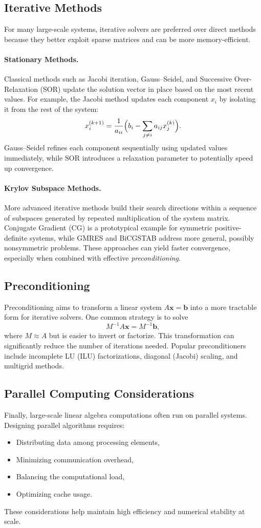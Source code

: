 \subsection{Iterative Methods}
For many large-scale systems, iterative solvers are preferred over direct methods because they better exploit sparse 
matrices and can be more memory-efficient.

\paragraph{Stationary Methods.}
Classical methods such as Jacobi iteration, Gauss--Seidel, and Successive Over-Relaxation (SOR) update the solution 
vector in place based on the most recent values. For example, the Jacobi method updates each component \(x_i\) by 
isolating it from the rest of the system:
\[
x_i^{(k+1)} 
= \frac{1}{a_{ii}} \Bigl(b_i - \sum_{j \neq i} a_{ij} x_j^{(k)}\Bigr).
\]
Gauss--Seidel refines each component sequentially using updated values immediately, while SOR introduces a 
relaxation parameter to potentially speed up convergence.

\paragraph{Krylov Subspace Methods.}
More advanced iterative methods build their search directions within a sequence of subspaces generated by repeated 
multiplication of the system matrix. Conjugate Gradient (CG) is a prototypical example for symmetric positive-definite 
systems, while GMRES and BiCGSTAB address more general, possibly nonsymmetric problems. These approaches can yield 
faster convergence, especially when combined with effective \emph{preconditioning}.

\subsection{Preconditioning}
Preconditioning aims to transform a linear system \(A \mathbf{x} = \mathbf{b}\) into a more tractable form for iterative 
solvers. One common strategy is to solve
\[
M^{-1} A \mathbf{x} = M^{-1} \mathbf{b},
\]
where \(M\approx A\) but is easier to invert or factorize. This transformation can significantly reduce the number of 
iterations needed. Popular preconditioners include incomplete LU (ILU) factorizations, diagonal (Jacobi) scaling, 
and multigrid methods.

\subsection{Parallel Computing Considerations}
Finally, large-scale linear algebra computations often run on parallel systems. Designing parallel algorithms requires:
\begin{itemize}
    \item Distributing data among processing elements,
    \item Minimizing communication overhead,
    \item Balancing the computational load,
    \item Optimizing cache usage.
\end{itemize}
These considerations help maintain high efficiency and numerical stability at scale.
